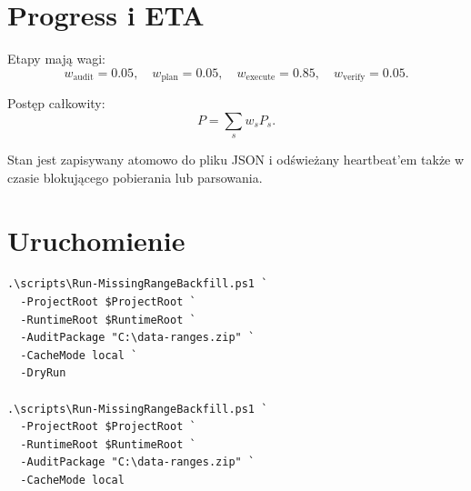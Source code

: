 \documentclass[11pt,a4paper]{article}
\begin{document}
\section{Progress i ETA}

Etapy mają wagi:
\[
  w_{\mathrm{audit}}=0.05,\quad
  w_{\mathrm{plan}}=0.05,\quad
  w_{\mathrm{execute}}=0.85,\quad
  w_{\mathrm{verify}}=0.05.
\]

Postęp całkowity:
\[
 P=\sum_s w_s P_s.
\]

Stan jest zapisywany atomowo do pliku JSON i odświeżany heartbeat'em także
w czasie blokującego pobierania lub parsowania.

\section{Uruchomienie}

\begin{lstlisting}
.\scripts\Run-MissingRangeBackfill.ps1 `
  -ProjectRoot $ProjectRoot `
  -RuntimeRoot $RuntimeRoot `
  -AuditPackage "C:\data-ranges.zip" `
  -CacheMode local `
  -DryRun

.\scripts\Run-MissingRangeBackfill.ps1 `
  -ProjectRoot $ProjectRoot `
  -RuntimeRoot $RuntimeRoot `
  -AuditPackage "C:\data-ranges.zip" `
  -CacheMode local
\end{lstlisting}
\end{document}
